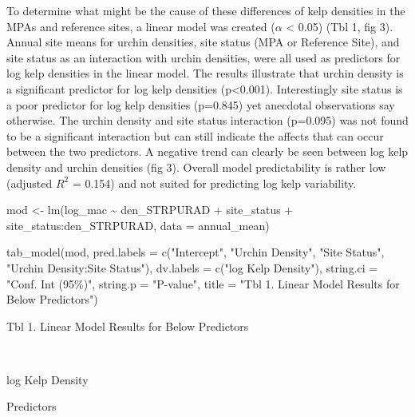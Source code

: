 \documentclass[
]{article}
\newenvironment{Shaded}{\begin{snugshade}}{\end{snugshade}}
\newcommand{\AttributeTok}[1]{\textcolor[rgb]{0.77,0.63,0.00}{#1}}
\newcommand{\FunctionTok}[1]{\textcolor[rgb]{0.00,0.00,0.00}{#1}}
\newcommand{\NormalTok}[1]{#1}
\newcommand{\OtherTok}[1]{\textcolor[rgb]{0.56,0.35,0.01}{#1}}
\newcommand{\SpecialCharTok}[1]{\textcolor[rgb]{0.00,0.00,0.00}{#1}}
\newcommand{\StringTok}[1]{\textcolor[rgb]{0.31,0.60,0.02}{#1}}
\begin{document}
To determine what might be the cause of these differences of kelp
densities in the MPAs and reference sites, a linear model was created
(\(\alpha\) \textless{} 0.05) (Tbl 1, fig 3). Annual site means for
urchin densities, site status (MPA or Reference Site), and site status
as an interaction with urchin densities, were all used as predictors for
log kelp densities in the linear model. The results illustrate that
urchin density is a significant predictor for log kelp densities
(p\textless0.001). Interestingly site status is a poor predictor for log
kelp densities (p=0.845) yet anecdotal observations say otherwise. The
urchin density and site status interaction (p=0.095) was not found to be
a significant interaction but can still indicate the affects that can
occur between the two predictors. A negative trend can clearly be seen
between log kelp density and urchin densities (fig 3). Overall model
predictability is rather low (adjusted \(R^{2}\) = 0.154) and not suited
for predicting log kelp variability.

\begin{Shaded}
\begin{Highlighting}[]
\NormalTok{mod }\OtherTok{\textless{}{-}} \FunctionTok{lm}\NormalTok{(log\_mac }\SpecialCharTok{\textasciitilde{}}\NormalTok{ den\_STRPURAD }\SpecialCharTok{+}\NormalTok{ site\_status }\SpecialCharTok{+}\NormalTok{ site\_status}\SpecialCharTok{:}\NormalTok{den\_STRPURAD, }
        \AttributeTok{data =}\NormalTok{ annual\_mean)}

\FunctionTok{tab\_model}\NormalTok{(mod,}
          \AttributeTok{pred.labels =} \FunctionTok{c}\NormalTok{(}\StringTok{"Intercept"}\NormalTok{, }\StringTok{"Urchin Density"}\NormalTok{, }\StringTok{"Site Status"}\NormalTok{, }
                          \StringTok{"Urchin Density:Site Status"}\NormalTok{),}
          \AttributeTok{dv.labels =} \FunctionTok{c}\NormalTok{(}\StringTok{"log Kelp Density"}\NormalTok{),}
          \AttributeTok{string.ci =} \StringTok{"Conf. Int (95\%)"}\NormalTok{,}
          \AttributeTok{string.p =} \StringTok{"P{-}value"}\NormalTok{,}
          \AttributeTok{title =} \StringTok{"Tbl 1. Linear Model Results for Below Predictors"}\NormalTok{)}
\end{Highlighting}
\end{Shaded}

Tbl 1. Linear Model Results for Below Predictors

~

log Kelp Density

Predictors
\end{document}
